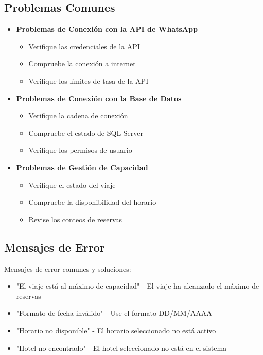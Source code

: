 \subsection{Problemas Comunes}
\begin{itemize}
    \item \textbf{Problemas de Conexión con la API de WhatsApp}
        \begin{itemize}
            \item Verifique las credenciales de la API
            \item Compruebe la conexión a internet
            \item Verifique los límites de tasa de la API
        \end{itemize}
    \item \textbf{Problemas de Conexión con la Base de Datos}
        \begin{itemize}
            \item Verifique la cadena de conexión
            \item Compruebe el estado de SQL Server
            \item Verifique los permisos de usuario
        \end{itemize}
    \item \textbf{Problemas de Gestión de Capacidad}
        \begin{itemize}
            \item Verifique el estado del viaje
            \item Compruebe la disponibilidad del horario
            \item Revise los conteos de reservas
        \end{itemize}
\end{itemize}

\subsection{Mensajes de Error}
Mensajes de error comunes y soluciones:
\begin{itemize}
    \item "El viaje está al máximo de capacidad" - El viaje ha alcanzado el máximo de reservas
    \item "Formato de fecha inválido" - Use el formato DD/MM/AAAA
    \item "Horario no disponible" - El horario seleccionado no está activo
    \item "Hotel no encontrado" - El hotel seleccionado no está en el sistema
\end{itemize}

